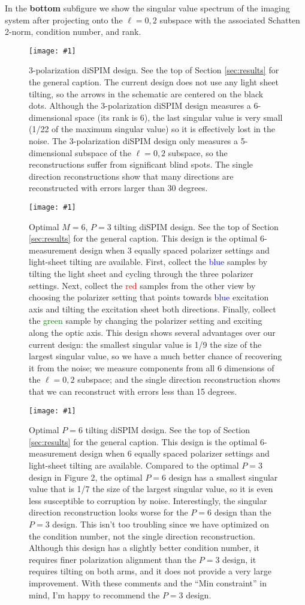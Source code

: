 \documentclass[11pt]{article}
\providecommand{\fig}[4]{
\begin{figure}[H]
 \captionsetup{width=1.0\linewidth}
 \centering
 \texttt{[image: \#1]}
 \caption{#3}
 \label{fig:#4}
\end{figure}
}
\begin{document}
In the \textbf{bottom} subfigure we show the singular value spectrum of the
imaging system after projecting onto the $\ell = 0, 2$ subspace with the associated
Schatten 2-norm, condition number, and rank. 

\fig{../figures/custom-designs/3dispim.pdf}{1.0}{3-polarization diSPIM design.
  See the top of Section \ref{sec:results} for the general caption. The current design
  does not use any light sheet tilting, so the arrows in the schematic are
  centered on the black dots. Although the 3-polarization diSPIM design measures
  a 6-dimensional space (its rank is 6), the last singular value is very small
  (1/22 of the maximum singular value) so it is effectively lost in the noise.
  The 3-polarization diSPIM design only measures a 5-dimensional subspace of the
  $\ell = 0, 2$ subspace, so the reconstructions suffer from significant blind
  spots. The single direction reconstructions show that many directions are
  reconstructed with errors larger than 30 degrees.}{3dispim}

\fig{../figures/custom-designs/optimal-6pol.pdf}{1.0}{Optimal $M=6$, $P=3$
  tilting diSPIM design. See the top of Section \ref{sec:results} for the general
  caption. This design is the optimal $6$-measurement design when $3$ equally
  spaced polarizer settings and light-sheet tilting are available. First,
  collect the \textcolor{blue}{blue} samples by tilting the light sheet and
  cycling through the three polarizer settings. Next, collect the
  \textcolor{red}{red} samples from the other view by choosing the polarizer
  setting that points towards \textcolor{blue}{blue} excitation axis and tilting
  the excitation sheet both directions. Finally, collect the
  \textcolor{green}{green} sample by changing the polarizer setting and exciting
  along the optic axis. This design shows several advantages over our current
  design: the smallest singular value is 1/9 the size of the largest singular
  value, so we have a much better chance of recovering it from the noise; we
  measure components from all 6 dimensions of the $\ell=0, 2$ subspace; and the
  single direction reconstruction shows that we can reconstruct with errors less
  than 15 degrees.}{33dispim}

\fig{../figures/custom-designs/optimal-6pol-6choice.pdf}{1.0}{Optimal $P=6$
  tilting diSPIM design. See the top of Section \ref{sec:results} for the general
  caption. This design is the optimal $6$-measurement design when $6$ equally
  spaced polarizer settings and light-sheet tilting are available. Compared to
  the optimal $P=3$ design in Figure 2, the optimal $P=6$ design has a smallest
  singular value that is 1/7 the size of the largest singular value, so it is
  even less susceptible to corruption by noise. Interestingly, the singular
  direction reconstruction looks worse for the $P=6$ design than the $P=3$
  design. This isn't too troubling since we have optimized on the condition
  number, not the single direction reconstruction. Although this design has a
  slightly better condition number, it requires finer polarization alignment
  than the $P=3$ design, it requires tilting on both arms, and it does not
  provide a very large improvement. With these comments and the ``Min constraint''
  in mind, I'm happy to recommend the $P=3$ design.}{36dispim}
\end{document}
